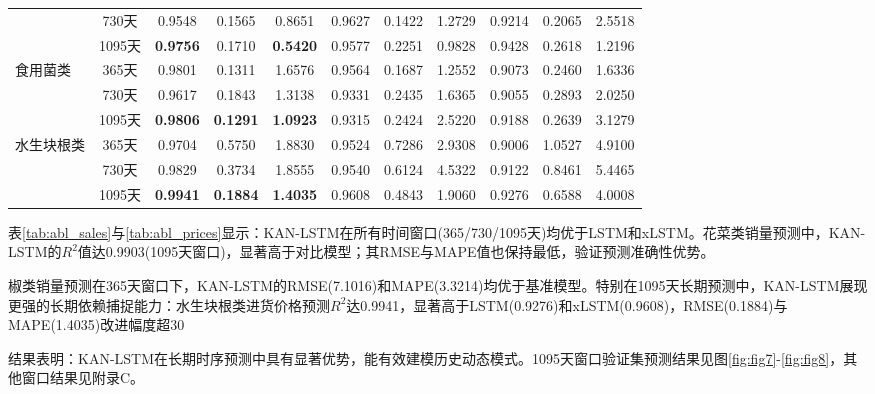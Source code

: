 \documentclass[lang=cn,12pt,a4paper]{elegantpaper}
\begin{document}
\begin{table}[H]
{\begin{tabular}{lcccccccccc}
      & 730天 & \color{red}0.9548 & \color{red}0.1565 & \color{red}0.8651 & 0.9627 & 0.1422 & 1.2729 & 0.9214 & 0.2065 & 2.5518 \\
      & 1095天 & \textbf{\color{red}0.9756} & \color{red}0.1710 & \textbf{\color{red}0.5420} & 0.9577 & 0.2251 & 0.9828 & 0.9428 & 0.2618 & 1.2196 \\
    \multirow{3}{*}{食用菌类} 
      & 365天 & \color{red}0.9801 & \color{red}0.1311 & \color{red}1.6576 & 0.9564 & 0.1687 & 1.2552 & 0.9073 & 0.2460 & 1.6336 \\
      & 730天 & \color{red}0.9617 & \color{red}0.1843 & \color{red}1.3138 & 0.9331 & 0.2435 & 1.6365 & 0.9055 & 0.2893 & 2.0250 \\
      & 1095天 & \textbf{\color{red}0.9806} & \textbf{\color{red}0.1291} & \textbf{\color{red}1.0923} & 0.9315 & 0.2424 & 2.5220 & 0.9188 & 0.2639 & 3.1279 \\
    \multirow{3}{*}{水生块根类} 
      & 365天 & \color{red}0.9704 & \color{red}0.5750 & \color{red}1.8830 & 0.9524 & 0.7286 & 2.9308 & 0.9006 & 1.0527 & 4.9100 \\
      & 730天 & \color{red}0.9829 & \color{red}0.3734 & \color{red}1.8555 & 0.9540 & 0.6124 & 4.5322 & 0.9122 & 0.8461 & 5.4465 \\
      & 1095天 & \textbf{\color{red}0.9941} & \textbf{\color{red}0.1884} & \textbf{\color{red}1.4035} & 0.9608 & 0.4843 & 1.9060 & 0.9276 & 0.6588 & 4.0008 \\
    \bottomrule
  \end{tabular}
  }
\end{table}

表\ref{tab:abl_sales}与\ref{tab:abl_prices}显示：KAN-LSTM在所有时间窗口(365/730/1095天)均优于LSTM和xLSTM。花菜类销量预测中，KAN-LSTM的$R^2$值达0.9903(1095天窗口)，显著高于对比模型；其RMSE与MAPE值也保持最低，验证预测准确性优势。

椒类销量预测在365天窗口下，KAN-LSTM的RMSE(7.1016)和MAPE(3.3214)均优于基准模型。特别在1095天长期预测中，KAN-LSTM展现更强的长期依赖捕捉能力：水生块根类进货价格预测$R^2$达0.9941，显著高于LSTM(0.9276)和xLSTM(0.9608)，RMSE(0.1884)与MAPE(1.4035)改进幅度超30%

结果表明：KAN-LSTM在长期时序预测中具有显著优势，能有效建模历史动态模式。1095天窗口验证集预测结果见图\ref{fig:fig7}-\ref{fig:fig8}，其他窗口结果见附录C。
\end{document}
